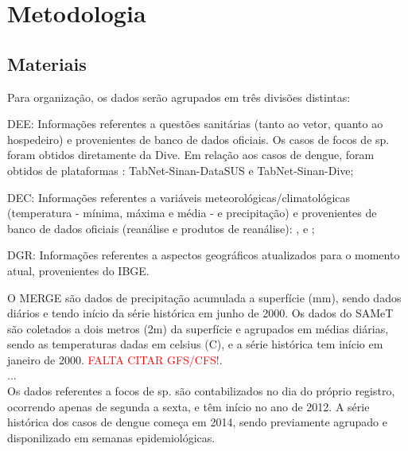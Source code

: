 \chapter{Metodologia}

\section{Materiais}

Para organização, os dados serão agrupados em três divisões distintas: 

\begin{alineas}
    \item \acrfull{DEE}: Informações referentes a questões sanitárias (tanto ao vetor, quanto ao hospedeiro) e provenientes de banco de dados oficiais.  Os casos de focos de  sp. foram obtidos diretamente da \acrshort{Dive}. Em relação aos casos de dengue, foram obtidos de plataformas : TabNet-\acrshort{Sinan}-\acrshort{DataSUS} e TabNet-\acrshort{Sinan}-\acrshort{Dive}; 
    
    \item \acrfull{DEC}: Informações referentes a variáveis meteorológicas/climatológicas (temperatura - mínima, máxima e média - e precipitação) e provenientes de banco de dados oficiais (reanálise e produtos de reanálise):  ,  e ;

    \item \acrfull{DGR}: Informações referentes a aspectos geográficos atualizados para o momento atual, provenientes do \acrshort{IBGE}. 
\end{alineas}

\indent O \acrshort{MERGE} são dados de precipitação acumulada a superfície (mm), sendo dados diários e tendo início da série histórica em junho de 2000. Os dados do \acrshort{SAMeT} são coletados a dois metros (2m) da superfície e agrupados em médias diárias, sendo as temperaturas dadas em celsius (C), e a série histórica tem início em janeiro de 2000. \textcolor{red}{FALTA CITAR GFS/CFS!}.\\
\indent ...\\
\indent Os dados referentes a focos de  sp. são contabilizados no dia do próprio registro, ocorrendo apenas de segunda a sexta, e têm início no ano de 2012. A série histórica dos casos de dengue começa em 2014, sendo previamente agrupado e disponilizado em semanas epidemiológicas.\\


